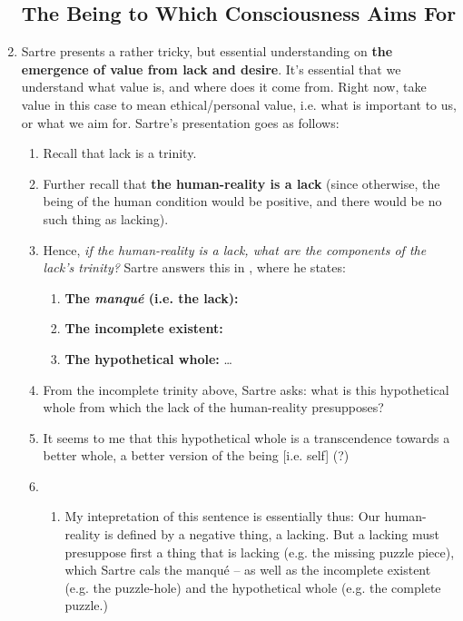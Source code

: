 \begin{enumerate}
  \subsection*{The Being to Which Consciousness Aims For}
  \item Sartre presents a rather tricky, but essential understanding on \textbf{the emergence of value from lack and desire}. It's essential that we understand what value is, and where does it come from. Right now, take value in this case to mean ethical/personal value, i.e. what is important to us, or what we aim for. Sartre's presentation goes as follows:
  \begin{enumerate}
    \item Recall that lack is a trinity.
    \item Further recall that \textbf{the human-reality is a lack} (since otherwise, the being of the human condition would be positive, and there would be no such thing as lacking).
    \item Hence, \emph{if the human-reality is a lack, what are the components of the lack's trinity?} Sartre answers this in \autocite[140]{sartre}, where he states:
    \begin{enumerate}
      \item \textbf{The \emph{manqué} (i.e. the lack):} 
      \item \textbf{The incomplete existent:} 
      \item \textbf{The hypothetical whole:} \ldots
    \end{enumerate}
    \item From the incomplete trinity above, Sartre asks: what is this hypothetical whole from which the lack of the human-reality presupposes?
    \item It seems to me that this hypothetical whole is a transcendence towards a better whole, a better version of the being [i.e. self] (?)
    \item {}
    \begin{enumerate}
      \item My intepretation of this sentence is essentially thus: Our human-reality is defined by a negative thing, a lacking. But a lacking must presuppose first a thing that is lacking (e.g. the missing puzzle piece), which Sartre cals the manqué -- as well as the incomplete existent (e.g. the puzzle-hole) and the hypothetical whole (e.g. the complete puzzle.)

\end{enumerate}
\end{enumerate}
\end{enumerate}
